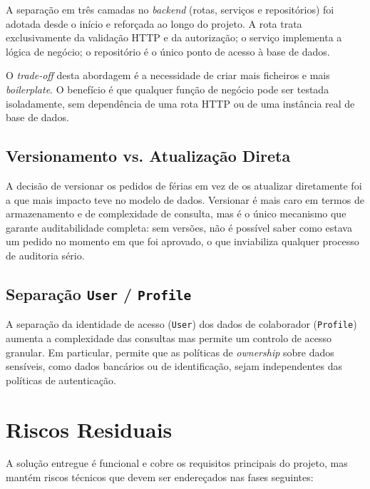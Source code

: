 \documentclass[12pt, a4paper, twoside, openright]{report}
\begin{document}
A separação em três camadas no \textit{backend} (rotas, serviços e repositórios) foi adotada desde o início e reforçada ao longo do projeto. A rota trata exclusivamente
da validação HTTP e da autorização; o serviço implementa a lógica de negócio; o
repositório é o único ponto de acesso à base de dados.

O \textit{trade-off} desta abordagem é a necessidade de criar mais ficheiros e mais
\textit{boilerplate}. O benefício é que qualquer função de negócio pode ser testada
isoladamente, sem dependência de uma rota HTTP ou de uma instância real de base de dados.

\subsection{Versionamento vs. Atualização Direta}

A decisão de versionar os pedidos de férias em vez de os atualizar diretamente
foi a que mais impacto teve no modelo de dados. Versionar é mais caro em termos
de armazenamento e de complexidade de consulta, mas é o único mecanismo que
garante auditabilidade completa: sem versões, não é possível saber como estava
um pedido no momento em que foi aprovado, o que inviabiliza qualquer processo
de auditoria sério.

\subsection{Separação \texttt{User} / \texttt{Profile}}

A separação da identidade de acesso (\texttt{User}) dos dados de colaborador
(\texttt{Profile}) aumenta a complexidade das consultas mas permite um controlo
de acesso granular. Em particular, permite que as políticas de \textit{ownership}
sobre dados sensíveis, como dados bancários ou de identificação, sejam
independentes das políticas de autenticação.

\section{Riscos Residuais}

A solução entregue é funcional e cobre os requisitos principais do projeto, mas
mantém riscos técnicos que devem ser endereçados nas fases seguintes:
\end{document}
